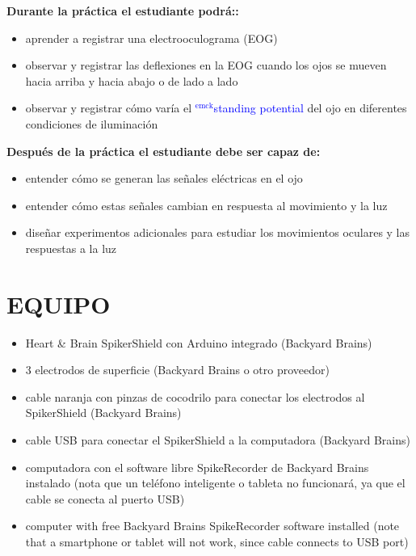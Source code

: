 \documentclass[12pt]{article}
\newcommand{\emck}[1]{\textcolor{blue}{$^{\textrm{emck}}${#1}}}
\begin{document}
\vspace{0.3cm}

\textbf{Durante la práctica el estudiante podrá::}
\begin{itemize}
\item aprender a registrar una electrooculograma (EOG) 
\item observar y registrar las deflexiones en la EOG cuando los ojos se
  mueven hacia arriba y hacia abajo o de lado a lado
\item observar y registrar cómo varía el \emck{standing potential} del ojo
en diferentes condiciones de iluminación
\end{itemize}

\vspace{0.3cm}
 
\textbf{Después de la práctica el estudiante debe ser capaz de:}
\begin{itemize}
\item entender cómo se generan las señales eléctricas en el ojo
\item entender cómo estas señales cambian en respuesta al movimiento y la luz
\item diseñar experimentos adicionales para estudiar los movimientos
  oculares y las respuestas a la luz
\end{itemize}

\section*{EQUIPO}

\begin{itemize}
\item Heart \& Brain SpikerShield con Arduino integrado (Backyard
  Brains)
\item 3 electrodos de superficie (Backyard Brains o otro proveedor)
\item cable naranja con pinzas de cocodrilo para conectar los
  electrodos al SpikerShield (Backyard Brains)
\item cable USB para conectar el SpikerShield a la computadora
  (Backyard Brains)
\item computadora con el software libre SpikeRecorder de Backyard
  Brains instalado (nota que un teléfono inteligente o tableta no
  funcionará, ya que el cable se conecta al puerto USB)
\item computer with free Backyard Brains SpikeRecorder software
  installed (note that a smartphone or tablet will not work, since
  cable connects to USB port)
\end{itemize}
\end{document}
